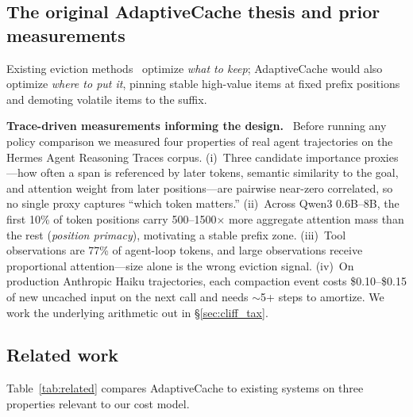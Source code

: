 \documentclass[letterpaper,twocolumn,10pt]{article}
\newcommand{\sysname}{AdaptiveCache}
\newcommand{\para}[1]{\smallskip\noindent\textbf{#1.}\ }
\begin{document}
\subsection{The original \sysname{} thesis and prior measurements}

Existing eviction
methods~\cite{zhang2023h2o,xiao2024streamingllm,li2024snapkv,
liu2023scissorhands,cai2024pyramidkv} optimize \emph{what to keep};
\sysname{} would also optimize \emph{where to put it}, pinning
stable high-value items at fixed prefix positions and demoting
volatile items to the suffix.

\para{Trace-driven measurements informing the design} Before
running any policy comparison we measured four properties of
real agent trajectories on the Hermes Agent Reasoning Traces
corpus. (i)~Three candidate importance proxies---how often a
span is referenced by later tokens, semantic similarity to the
goal, and attention weight from later positions---are pairwise
near-zero correlated, so no single proxy captures ``which token
matters.'' (ii)~Across Qwen3 0.6B--8B, the first 10\% of token
positions carry 500--1500$\times$ more aggregate attention mass
than the rest (\emph{position primacy}), motivating a stable
prefix zone. (iii)~Tool observations are 77\% of agent-loop
tokens, and large observations receive proportional
attention---size alone is the wrong eviction signal. (iv)~On
production Anthropic Haiku trajectories, each compaction event
costs \$0.10--\$0.15 of new uncached input on the next call and
needs $\sim$5+ steps to amortize. We work the underlying
arithmetic out in \S\ref{sec:cliff_tax}.


\subsection{Related work}

Table~\ref{tab:related} compares \sysname{} to existing systems on
three properties relevant to our cost model.
\end{document}
